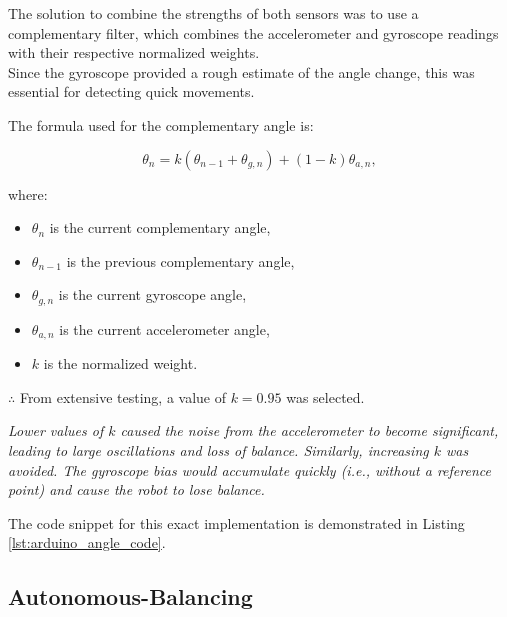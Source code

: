 \documentclass{article}
\begin{document}
\begin{minipage}{\linewidth}
    The solution to combine the strengths of both sensors was to use a complementary filter,
    which combines the accelerometer and gyroscope readings with their respective normalized weights. \\

    Since the gyroscope provided a rough estimate of the angle change, this was essential for detecting quick movements. \\
\end{minipage}

The formula used for the complementary angle is:

\[
\theta_n = k(\theta_{n-1} + \theta_{g,n}) + (1-k)\theta_{a,n},
\]

where:
\begin{itemize}
    \item $\theta_n$ is the current complementary angle,
    \item $\theta_{n-1}$ is the previous complementary angle,
    \item $\theta_{g,n}$ is the current gyroscope angle,
    \item $\theta_{a,n}$ is the current accelerometer angle,
    \item $k$ is the normalized weight.
\end{itemize}

\begin{center}
    $\therefore$ From extensive testing, a value of $k = 0.95$ was selected. \\
\end{center}

\textit{
    Lower values of $k$ caused the noise from the accelerometer to become significant, leading to large oscillations and loss of balance.
    Similarly, increasing $k$ was avoided. The gyroscope bias would accumulate quickly (i.e., without a reference point)
    and cause the robot to lose balance.
}\vspace{0.5cm}

The code snippet for this exact implementation is demonstrated in Listing \ref{lst:arduino_angle_code}.

\subsection{Autonomous-Balancing}
\end{document}
